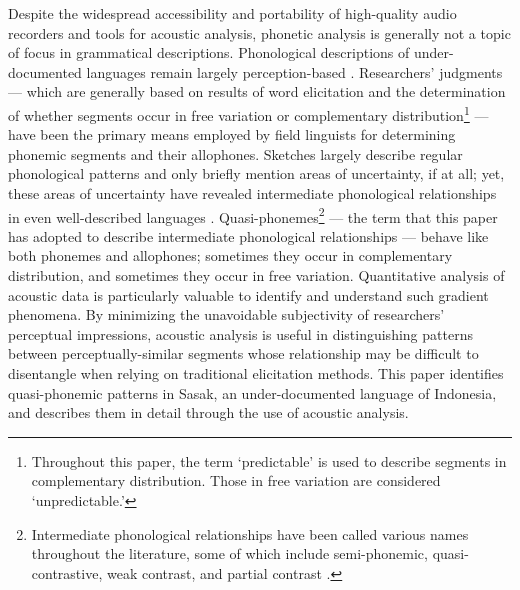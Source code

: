 \documentclass[12pt]{ouparticle}
\begin{document}
Despite the widespread accessibility and portability of high-quality audio recorders and tools for acoustic analysis, phonetic analysis is generally not a topic of focus in grammatical descriptions. Phonological descriptions of under-documented languages remain largely perception-based \citep{maddieson2002}. Researchers' judgments --- which are generally based on results of word elicitation and the determination of whether segments occur in free variation or complementary distribution\footnote{Throughout this paper, the term `predictable' is used to describe segments in complementary distribution. Those in free variation are considered `unpredictable.'} --- have been the primary means employed by field linguists for determining phonemic segments and their allophones. Sketches largely describe regular phonological patterns and only briefly mention areas of uncertainty, if at all; yet, these areas of uncertainty have revealed intermediate phonological relationships in even well-described languages \citep{hall2013}. Quasi-phonemes\footnote{Intermediate phonological relationships have been called various names throughout the literature, some of which include semi-phonemic, quasi-contrastive, weak contrast, and partial contrast \citep{hall2013}.} --- the term that this paper has adopted to describe intermediate phonological relationships --- behave like both phonemes and allophones; sometimes they occur in complementary distribution, and sometimes they occur in free variation. Quantitative analysis of acoustic data is particularly valuable to identify and understand such gradient phenomena. By minimizing the unavoidable subjectivity of researchers' perceptual impressions, acoustic analysis is useful in distinguishing patterns between perceptually-similar segments whose relationship may be difficult to disentangle when relying on traditional elicitation methods. This paper identifies quasi-phonemic patterns in Sasak, an under-documented language of Indonesia, and describes them in detail through the use of acoustic analysis.
\end{document}
